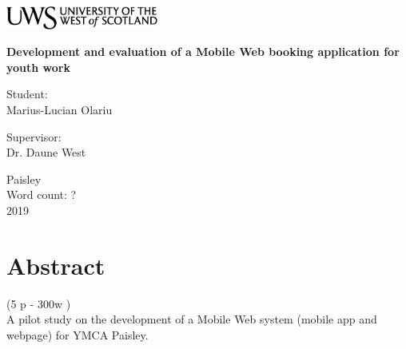 \documentclass[version=last,fontsize=13pt]{scrartcl}
\begin{document}
\begin{titlepage}
	\begin{center}	
		\includegraphics[width = 5cm,height = 1.5cm]{./imgs/uws_logo.png}\\[5cm]

	{ \huge \bfseries %
		Development and evaluation of a Mobile Web booking application for youth work\\ \Large 
}
	\vspace{2cm}
	
	\vspace{2cm}			
			

			
		\begin{flushright}
				\large Student:\\
				Marius-Lucian Olariu\\[1cm]
		\end{flushright}
		
	
		\begin{flushleft}
			 \large
				Supervisor: \\
				Dr. Daune West \\[1cm]
		\end{flushleft}
		
	\vspace{2cm}	
	
		
		\vfill

			{\large {Paisley \\ Word count: ? \\ 2019}}
		\end{center}
\end{titlepage}

\renewcommand{\labelenumi}{\roman{enumi}}

\newpage

\tableofcontents

\newpage

\listoffigures

\newpage

\section{Abstract}(5 p - 300w )\\
A pilot study on the development of a Mobile Web system (mobile app and webpage) for YMCA Paisley.
\end{document}
